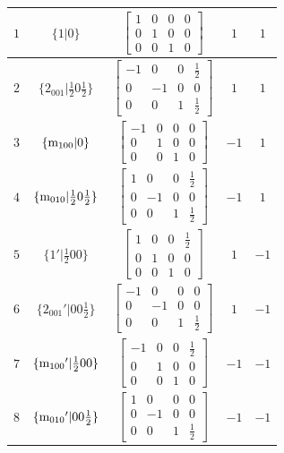 \documentclass[fleqn,8pt]{jsarticle}
\begin{document}
\begin{longtable}{ccccc}
$ 1 $ & $ \{1|0\} $ & $ \begin{bmatrix} 1 & 0 & 0 & 0 \\ 0 & 1 & 0 & 0 \\ 0 & 0 & 1 & 0 \end{bmatrix} $ & $ 1 $ & $ 1 $ \\ \hline
$ 2 $ & $ \{2{}_{001}|\frac{1}{2} 0 \frac{1}{2}\} $ & $ \begin{bmatrix} -1 & 0 & 0 & \frac{1}{2} \\ 0 & -1 & 0 & 0 \\ 0 & 0 & 1 & \frac{1}{2} \end{bmatrix} $ & $ 1 $ & $ 1 $ \\ \hline
$ 3 $ & $ \{{\rm m}_{100}|0\} $ & $ \begin{bmatrix} -1 & 0 & 0 & 0 \\ 0 & 1 & 0 & 0 \\ 0 & 0 & 1 & 0 \end{bmatrix} $ & $ -1 $ & $ 1 $ \\ \hline
$ 4 $ & $ \{{\rm m}_{010}|\frac{1}{2} 0 \frac{1}{2}\} $ & $ \begin{bmatrix} 1 & 0 & 0 & \frac{1}{2} \\ 0 & -1 & 0 & 0 \\ 0 & 0 & 1 & \frac{1}{2} \end{bmatrix} $ & $ -1 $ & $ 1 $ \\ \hline
$ 5 $ & $ \{1{}'|\frac{1}{2} 0 0\} $ & $ \begin{bmatrix} 1 & 0 & 0 & \frac{1}{2} \\ 0 & 1 & 0 & 0 \\ 0 & 0 & 1 & 0 \end{bmatrix} $ & $ 1 $ & $ -1 $ \\ \hline
$ 6 $ & $ \{2{}_{001}{}'|0 0 \frac{1}{2}\} $ & $ \begin{bmatrix} -1 & 0 & 0 & 0 \\ 0 & -1 & 0 & 0 \\ 0 & 0 & 1 & \frac{1}{2} \end{bmatrix} $ & $ 1 $ & $ -1 $ \\ \hline
$ 7 $ & $ \{{\rm m}_{100}{}'|\frac{1}{2} 0 0\} $ & $ \begin{bmatrix} -1 & 0 & 0 & \frac{1}{2} \\ 0 & 1 & 0 & 0 \\ 0 & 0 & 1 & 0 \end{bmatrix} $ & $ -1 $ & $ -1 $ \\ \hline
$ 8 $ & $ \{{\rm m}_{010}{}'|0 0 \frac{1}{2}\} $ & $ \begin{bmatrix} 1 & 0 & 0 & 0 \\ 0 & -1 & 0 & 0 \\ 0 & 0 & 1 & \frac{1}{2} \end{bmatrix} $ & $ -1 $ & $ -1 $ \\
\end{longtable}
\end{document}
